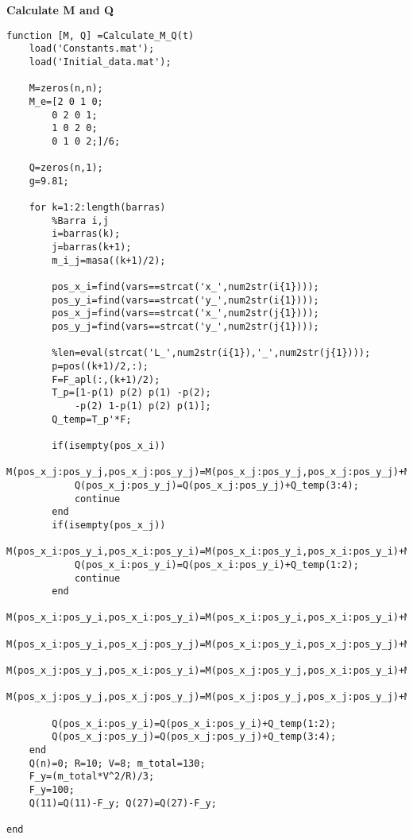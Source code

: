 \newpage
\textbf{Calculate M and Q}
\begin{lstlisting}[style=codematlab]
function [M, Q] =Calculate_M_Q(t)
    load('Constants.mat');
    load('Initial_data.mat'); 
    
    M=zeros(n,n);
    M_e=[2 0 1 0;
        0 2 0 1;
        1 0 2 0;
        0 1 0 2;]/6;
    
    Q=zeros(n,1);
    g=9.81;
    
    for k=1:2:length(barras)
        %Barra i,j
        i=barras(k);
        j=barras(k+1);
        m_i_j=masa((k+1)/2);
        
        pos_x_i=find(vars==strcat('x_',num2str(i{1})));
        pos_y_i=find(vars==strcat('y_',num2str(i{1})));
        pos_x_j=find(vars==strcat('x_',num2str(j{1})));
        pos_y_j=find(vars==strcat('y_',num2str(j{1})));
        
        %len=eval(strcat('L_',num2str(i{1}),'_',num2str(j{1})));
        p=pos((k+1)/2,:);
        F=F_apl(:,(k+1)/2);
        T_p=[1-p(1) p(2) p(1) -p(2);
            -p(2) 1-p(1) p(2) p(1)];
        Q_temp=T_p'*F;
        
        if(isempty(pos_x_i))
            M(pos_x_j:pos_y_j,pos_x_j:pos_y_j)=M(pos_x_j:pos_y_j,pos_x_j:pos_y_j)+M_e(3:4,3:4)*m_i_j;
            Q(pos_x_j:pos_y_j)=Q(pos_x_j:pos_y_j)+Q_temp(3:4);
            continue
        end
        if(isempty(pos_x_j))
            M(pos_x_i:pos_y_i,pos_x_i:pos_y_i)=M(pos_x_i:pos_y_i,pos_x_i:pos_y_i)+M_e(1:2,1:2)*m_i_j;
            Q(pos_x_i:pos_y_i)=Q(pos_x_i:pos_y_i)+Q_temp(1:2);
            continue
        end
        M(pos_x_i:pos_y_i,pos_x_i:pos_y_i)=M(pos_x_i:pos_y_i,pos_x_i:pos_y_i)+M_e(1:2,1:2)*m_i_j;
        M(pos_x_i:pos_y_i,pos_x_j:pos_y_j)=M(pos_x_i:pos_y_i,pos_x_j:pos_y_j)+M_e(1:2,3:4)*m_i_j;
        M(pos_x_j:pos_y_j,pos_x_i:pos_y_i)=M(pos_x_j:pos_y_j,pos_x_i:pos_y_i)+M_e(3:4,1:2)*m_i_j;
        M(pos_x_j:pos_y_j,pos_x_j:pos_y_j)=M(pos_x_j:pos_y_j,pos_x_j:pos_y_j)+M_e(3:4,3:4)*m_i_j;  
        
        Q(pos_x_i:pos_y_i)=Q(pos_x_i:pos_y_i)+Q_temp(1:2);
        Q(pos_x_j:pos_y_j)=Q(pos_x_j:pos_y_j)+Q_temp(3:4);
    end
    Q(n)=0; R=10; V=8; m_total=130;
    F_y=(m_total*V^2/R)/3;
    F_y=100;
    Q(11)=Q(11)-F_y; Q(27)=Q(27)-F_y;
    
end
\end{lstlisting}

